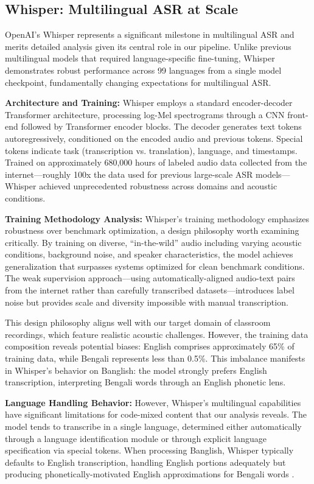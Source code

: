 \subsection{Whisper: Multilingual ASR at Scale}

OpenAI's Whisper \cite{Radford2023} represents a significant milestone in multilingual ASR and merits detailed analysis given its central role in our pipeline. Unlike previous multilingual models that required language-specific fine-tuning, Whisper demonstrates robust performance across 99 languages from a single model checkpoint, fundamentally changing expectations for multilingual ASR.

\textbf{Architecture and Training:} Whisper employs a standard encoder-decoder Transformer architecture, processing log-Mel spectrograms through a CNN front-end followed by Transformer encoder blocks. The decoder generates text tokens autoregressively, conditioned on the encoded audio and previous tokens. Special tokens indicate task (transcription vs. translation), language, and timestamps. Trained on approximately 680,000 hours of labeled audio data collected from the internet---roughly 100x the data used for previous large-scale ASR models---Whisper achieved unprecedented robustness across domains and acoustic conditions.

\textbf{Training Methodology Analysis:} Whisper's training methodology emphasizes robustness over benchmark optimization, a design philosophy worth examining critically. By training on diverse, ``in-the-wild'' audio including varying acoustic conditions, background noise, and speaker characteristics, the model achieves generalization that surpasses systems optimized for clean benchmark conditions. The weak supervision approach---using automatically-aligned audio-text pairs from the internet rather than carefully transcribed datasets---introduces label noise but provides scale and diversity impossible with manual transcription.

This design philosophy aligns well with our target domain of classroom recordings, which feature realistic acoustic challenges. However, the training data composition reveals potential biases: English comprises approximately 65\% of training data, while Bengali represents less than 0.5\%. This imbalance manifests in Whisper's behavior on Banglish: the model strongly prefers English transcription, interpreting Bengali words through an English phonetic lens.

\textbf{Language Handling Behavior:} However, Whisper's multilingual capabilities have significant limitations for code-mixed content that our analysis reveals. The model tends to transcribe in a single language, determined either automatically through a language identification module or through explicit language specification via special tokens. When processing Banglish, Whisper typically defaults to English transcription, handling English portions adequately but producing phonetically-motivated English approximations for Bengali words \cite{Peng2023}. 


